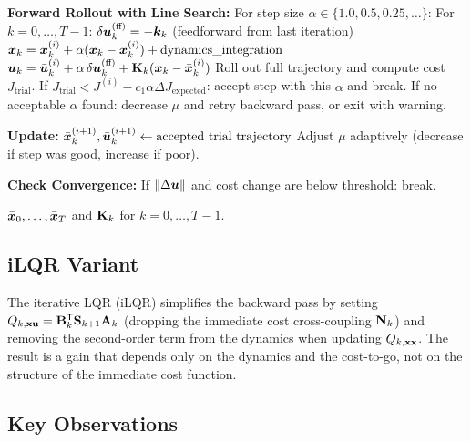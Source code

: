 \begin{algorithm}[H]
\begin{algorithmic}[1]
  \State \textbf{Forward Rollout with Line Search:}
  \State \quad For step size $\alpha \in \{1.0, 0.5, 0.25, \ldots\}$:
  \State \quad \quad For $k = 0, \ldots, T-1$:
  \State \quad \quad \quad $\delta\bm{u}_k^{(\text{ff})} = -\bm{k}_k$ (feedforward from last iteration)
  \State \quad \quad \quad $\bm{x}_k = \bar{\bm{x}}_k^{(i)} + \alpha (\bm{x}_k - \bar{\bm{x}}_k^{(i)}) + \text{dynamics\_integration}$
  \State \quad \quad \quad $\bm{u}_k = \bar{\bm{u}}_k^{(i)} + \alpha \,\delta\bm{u}_k^{(\text{ff})} + \mathbf{K}_k(\bm{x}_k - \bar{\bm{x}}_k^{(i)})$
  \State \quad \quad Roll out full trajectory and compute cost $J_{\text{trial}}$.
  \State \quad \quad If $J_{\text{trial}} < J^{(i)} - c_1\alpha\Delta J_{\text{expected}}$: accept step with this $\alpha$ and break.
  \State \quad If no acceptable $\alpha$ found: decrease $\mu$ and retry backward pass, or exit with warning.

  \State \textbf{Update:}
  \State \quad $\bar{\bm{x}}_k^{(i+1)}, \bar{\bm{u}}_k^{(i+1)} \gets \text{accepted trial trajectory}$
  \State \quad Adjust $\mu$ adaptively (decrease if step was good, increase if poor).

  \State \textbf{Check Convergence:}
  \State \quad If $\|\Delta \bm{u}\|$ and cost change are below threshold: break.
\EndFor

\Return $\bar{\bm{x}}_0, \ldots, \bar{\bm{x}}_T$ and $\mathbf{K}_k$ for $k = 0, \ldots, T-1$.
\end{algorithmic}
\end{algorithm}

\subsection{iLQR Variant}

The iterative LQR (iLQR) simplifies the backward pass by setting $Q_{k,\mathbf{x}\mathbf{u}} = \mathbf{B}_k^{\mathsf{T}}\mathbf{S}_{k+1}\mathbf{A}_k$
(dropping the immediate cost cross-coupling $\mathbf{N}_k$) and removing the second-order term from the dynamics
when updating $Q_{k,\mathbf{x}\mathbf{x}}$. The result is a gain that depends only on the dynamics and the cost-to-go, not on the
structure of the immediate cost function.

\subsection{Key Observations}


